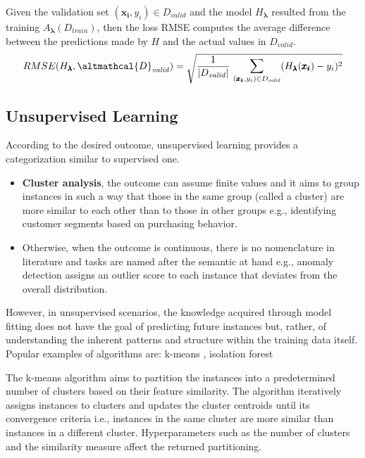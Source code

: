 \begin{example}\label{ex:rmse}
    Given the validation set $(\pmb{x_i}, y_i) \in D_\mathit{valid}$  and the model $H_{\pmb{\lambda}}$ resulted from the training $A_{\pmb{\lambda}}(D_\mathit{train})$, then the loss RMSE computes the average difference between the predictions made by $H$ and the actual values in $D_\mathit{valid}$.
    \begin{equation*}
        RMSE(H_{\pmb{\lambda}}, \altmathcal{D}_\mathit{valid}) = \sqrt{\frac{1}{|D_\mathit{valid}|}~\mathlarger{\sum}_{(\pmb{x_i}, y_i) \in D_\mathit{valid}} (H_{\pmb{\lambda}}(\pmb{x_i}) - y_i)^2}
    \end{equation*}
\end{example}

\subsection{Unsupervised Learning}

According to the desired outcome, unsupervised learning provides a categorization similar to supervised one.
\begin{itemize}
    \item \textbf{Cluster analysis}, the outcome can assume finite values and it aims to group instances in such a way that those in the same group (called a cluster) are more similar to each other than to those in other groups e.g., identifying customer segments based on purchasing behavior.
    \item Otherwise, when the outcome is continuous, there is no nomenclature in literature and tasks are named after the semantic at hand e.g., anomaly detection assigns an outlier score to each instance that deviates from the overall distribution.
\end{itemize}
However, in unsupervised scenarios, the knowledge acquired through model fitting does not have the goal of predicting future instances but, rather, of understanding the inherent patterns and structure within the training data itself.
Popular examples of algorithms are: k-means \cite{arthur2006k}, isolation forest \cite{random_forest}

\begin{example}
    The k-means algorithm aims to partition the instances into a predetermined number of clusters based on their feature similarity.
    The algorithm iteratively assigns instances to clusters and updates the cluster centroids until its convergence criteria i.e., instances in the same cluster are more similar than instances in a different cluster.
    Hyperparameters such as the number of clusters and the similarity measure affect the returned partitioning.
\end{example}

